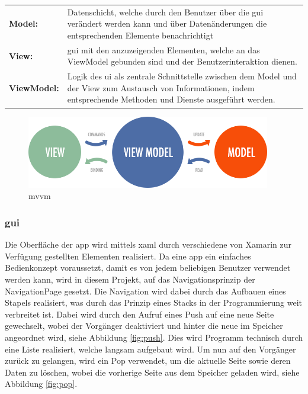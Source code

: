 \begin{tabular}{p{2.5cm} p{12.25cm}}
	\textbf{Model:} & Datenschicht, welche durch den Benutzer über die \gls{gui} verändert werden kann und über Datenänderungen die entsprechenden Elemente benachrichtigt \\
	\textbf{View:} & \gls{gui} mit den anzuzeigenden Elementen, welche an das ViewModel gebunden sind und der Benutzerinteraktion dienen. \\
	\textbf{ViewModel:} & Logik des \gls{ui} als zentrale Schnittstelle zwischen dem Model und der View zum Austausch von Informationen, indem entsprechende Methoden und Dienste ausgeführt werden. \\
\end{tabular}

\bigskip

\begin{figure}[h]
	\begin{center}
		\includegraphics[width=0.95\textwidth]{images/implementation/mvvm.png}
	\end{center}	
	\caption{\acrlong{mvvm} \cite{Brecht.MVVMEntity}}
	\label{fig:mvvm}
\end{figure}

\newpage
\subsubsection{\acrfull{gui}} %

Die Oberfläche der \gls{app} wird mittels \gls{xaml} durch verschiedene von Xamarin zur Verfügung gestellten Elementen realisiert. Da eine \gls{app} ein einfaches Bedienkonzept voraussetzt, damit es von jedem beliebigen Benutzer verwendet werden kann, wird in diesem Projekt, auf das Navigationsprinzip der NavigationPage gesetzt. Die Navigation wird dabei durch das Aufbauen eines Stapels realisiert, was durch das Prinzip eines Stacks in der Programmierung weit verbreitet ist. Dabei wird durch den Aufruf eines Push auf eine neue Seite gewechselt, wobei der Vorgänger deaktiviert und hinter die neue im Speicher angeordnet wird, siehe Abbildung \eqref{fig:push}. Dies wird Programm technisch durch eine Liste realisiert, welche langsam aufgebaut wird. Um nun auf den Vorgänger zurück zu gelangen, wird ein Pop verwendet, um die aktuelle Seite sowie deren Daten zu löschen, wobei die vorherige Seite aus dem Speicher geladen wird, siehe Abbildung \eqref{fig:pop}.\\

